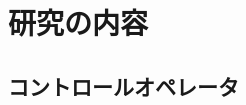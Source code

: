\documentclass[dvipdfmx,cjk,xcolor=dvipsnames,envcountsect,notheorems,12pt]{beamer}
\theoremstyle{definition}
\begin{document}

\section{研究の内容}






\subsection{コントロールオペレータ}
\end{document}

